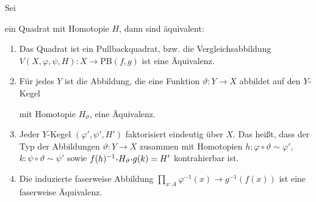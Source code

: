 \begin{lemma}
  Sei
  \begin{center}
  \end{center}
  ein Quadrat mit Homotopie $H$, dann sind äquivalent:
  \begin{enumerate}
  \item Das Quadrat ist ein Pullbackquadrat, bzw. die Vergleichsabbildung $V(X,\varphi,\psi,H):X\to\mathrm{PB}(f,g)$ ist eine Äquivalenz.
  \item Für jedes $Y$ ist die Abbildung, die eine Funktion $\vartheta:Y\to X$ abbildet auf den $Y$-Kegel
    \begin{center}
    \end{center}
    mit Homotopie $H_\vartheta$, eine Äquivalenz.
  \item Jeder $Y$-Kegel $(\varphi',\psi',H')$ faktorisiert eindeutig über $X$. Das heißt, dass der Typ der Abbildungen $\vartheta:Y\to X$ zusammen mit Homotopien $h:\varphi\circ \vartheta\sim\varphi'$, $k:\psi\circ \vartheta\sim\psi'$ sowie $f(h)^{-1}\kon H_\vartheta\kon g(k) = H'$ kontrahierbar ist.
  \item Die induzierte faserweise Abbildung $\prod_{x:A}\varphi^{-1}(x)\to g^{-1}(f(x))$ ist eine faserweise Äquivalenz.
  \end{enumerate}
\end{lemma}

